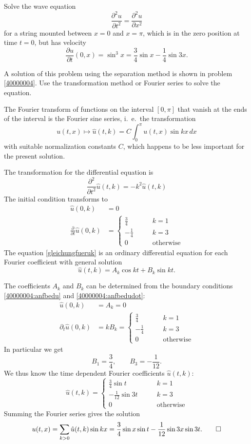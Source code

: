 Solve the wave equation
\[
\frac{\partial^2 u}{\partial t^2}=\frac{\partial^2 u}{\partial x^2}
\]
for a string mounted between $x=0$ and $x=\pi$,
which is in the zero position at time $t=0$, but has velocity
\[
\frac{\partial u}{\partial t}(0, x)
=
\sin^3 x=\frac34\sin x-\frac14\sin 3x.
\]

\begin{hinweis}
A solution of this problem using the separation method is shown in 
problem \ref{40000004}.
Use the transformation method or Fourier series to solve the equation.
\end{hinweis}

\begin{loesung}
The Fourier transform of functions on the interval $[0,\pi]$ that vanish
at the ends of the interval is the Fourier sine series, i.~e.~the
transformation
\[
u(t,x) \mapsto \hat u(t, k)= C\int_0^{\pi} u(t,x)\sin kx\, dx
\]
with suitable normalization constants $C$, which happens to be less important
for the present solution.

The transformation for the differential equation is
\begin{equation}
\frac{\partial^2}{\partial t^2}\hat u(t,k)
=-k^2\hat u(t,k)
\label{gleichungfueruk}
\end{equation}
The initial condition transforms to
\begin{align}
\hat u(0,k)&=0\label{40000004:anfbedu}\\
\frac{\partial}{\partial t}\hat u(0,k)&=
\begin{cases}
\frac34&\qquad k= 1\\
-\frac14&\qquad k= 3\\
0&\qquad \text{otherwise}
\end{cases}
\label{40000004:anfbedudot}
\end{align}
The equation
\eqref{gleichungfueruk}
is an ordinary differential equation for each Fourier coefficient
with general solution
\[
\hat u(t,k)=A_k\cos kt+B_k\sin kt.
\]

The coefficients $A_k$ and $B_k$ can be determined from the boundary
conditions \eqref{40000004:anfbedu} and \eqref{40000004:anfbedudot}:
\begin{align*}
\hat u(0,k)&=A_k=0\\
\partial_t \hat u(0,k)&=kB_k=
\begin{cases}
\frac34&\qquad k= 1\\
-\frac14&\qquad k= 3\\
0&\qquad \text{otherwise}
\end{cases}
\end{align*}
In particular we get
\[
B_1=\frac34,\qquad B_3=-\frac1{12}.
\]
We thus know the time dependent Fourier coefficients $\hat u(t,k)$:
\[
\hat u(t,k)=
\begin{cases}
\frac34\sin t &\qquad k= 1\\
-\frac1{12}\sin 3t&\qquad k= 3\\
0&\qquad \text{otherwise}
\end{cases}
\]
Summing the Fourier series gives the solution
\[
u(t,x)=\sum_{k>0}\hat u(t,k) \sin kx
= \frac34\sin x \sin t -\frac1{12}\sin 3x \sin 3t.
\qedhere
\]
\end{loesung}
 
